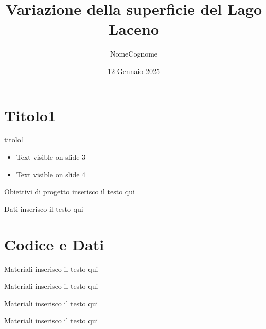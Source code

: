 \documentclass{beamer} %
\title{Variazione della superficie del Lago Laceno}
\author{NomeCognome}
\date{12 Gennaio 2025}
\begin{document}
\maketitle


\section{Titolo1}

        \begin{frame}{titolo1}
            \begin{itemize}
                \item Text visible on slide 3
                \item Text visible on slide 4
            \end{itemize}
        \end{frame}

        \begin{frame}{Obiettivi di progetto}
            inserisco il testo qui
        \end{frame}

        \begin{frame}{Dati}
            inserisco il testo qui
        \end{frame}

\section{Codice e Dati}

        \begin{frame}{Materiali}
            inserisco il testo qui
        \end{frame}
        
        \begin{frame}{Materiali}
            inserisco il testo qui
        \end{frame}
        
        \begin{frame}{Materiali}
            inserisco il testo qui
        \end{frame}
        
        \begin{frame}{Materiali}
            inserisco il testo qui
        \end{frame}
\end{document}
